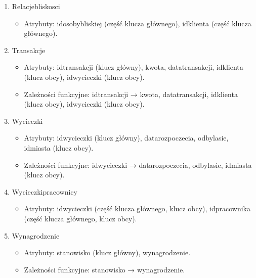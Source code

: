 \documentclass{article}
\begin{document}
\begin{enumerate}
		\item Relacje\textunderscore bliskosci
		\begin{itemize}
			\item Atrybuty: id\textunderscore osoby\textunderscore bliskiej (część klucza głównego), id\textunderscore klienta (część klucza głównego).
		\end{itemize}
		
		\item Transakcje
		\begin{itemize}
			\item Atrybuty: id\textunderscore transakcji (klucz główny), kwota, data\textunderscore transakcji, id\textunderscore klienta (klucz obcy), id\textunderscore wycieczki (klucz obcy).
			\item Zależności funkcyjne: id\textunderscore transakcji → kwota, data\textunderscore transakcji, id\textunderscore klienta (klucz obcy), id\textunderscore wycieczki (klucz obcy).
		\end{itemize}
		
		\item Wycieczki
		\begin{itemize}
			\item Atrybuty: id\textunderscore wycieczki (klucz główny), data\textunderscore rozpoczecia, odbyla\textunderscore sie, id\textunderscore miasta (klucz obcy).
			\item Zależności funkcyjne: id\textunderscore wycieczki → data\textunderscore rozpoczecia, odbyla\textunderscore sie, id\textunderscore miasta (klucz obcy).
		\end{itemize}
		
		\item Wycieczki\textunderscore pracownicy
		\begin{itemize}
			\item Atrybuty: id\textunderscore wycieczki (część klucza głównego, klucz obcy), id\textunderscore pracownika (część klucza głównego, klucz obcy).
		\end{itemize}
		
		\item Wynagrodzenie
		\begin{itemize}
			\item Atrybuty: stanowisko (klucz główny), wynagrodzenie.
			\item Zależności funkcyjne: stanowisko → wynagrodzenie.
		\end{itemize}
		
	\end{enumerate}
	
\end{document}
